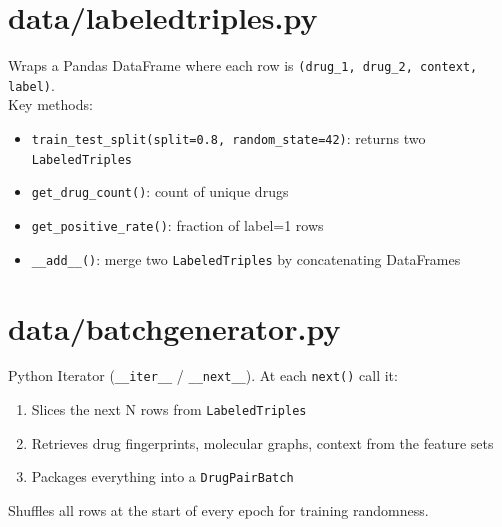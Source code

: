 \documentclass[12pt,a4paper,oneside]{book}
\begin{document}
\section{data/labeledtriples.py}
Wraps a Pandas DataFrame where each row is \texttt{(drug\_1, drug\_2, context, label)}.\\
Key methods:
\begin{itemize}
  \item \texttt{train\_test\_split(split=0.8, random\_state=42)}: returns two \texttt{LabeledTriples}
  \item \texttt{get\_drug\_count()}: count of unique drugs
  \item \texttt{get\_positive\_rate()}: fraction of label=1 rows
  \item \texttt{\_\_add\_\_()}: merge two \texttt{LabeledTriples} by concatenating DataFrames
\end{itemize}

\section{data/batchgenerator.py}
Python Iterator (\texttt{\_\_iter\_\_} / \texttt{\_\_next\_\_}). At each \texttt{next()} call it:
\begin{enumerate}
  \item Slices the next N rows from \texttt{LabeledTriples}
  \item Retrieves drug fingerprints, molecular graphs, context from the feature sets
  \item Packages everything into a \texttt{DrugPairBatch}
\end{enumerate}
Shuffles all rows at the start of every epoch for training randomness.
\end{document}
